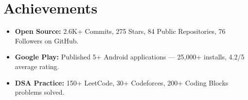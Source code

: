 \documentclass[letterpaper,11pt]{article}
\newcommand{\resumeItem}[1]{
  \item\small{#1 \vspace{-2pt}}
}
\newcommand{\resumeSubHeadingListStart}{\begin{itemize}[leftmargin=0.15in, label={}]}
\newcommand{\resumeSubHeadingListEnd}{\end{itemize}}
\begin{document}
\section{Achievements}
\resumeSubHeadingListStart
  \resumeItem{\textbf{Open Source:} 2.6K+ Commits, 275 Stars, 84 Public Repositories, 76 Followers on GitHub.}
  \resumeItem{\textbf{Google Play:} Published 5+ Android applications — 25,000+ installs, 4.2/5 average rating.}
  \resumeItem{\textbf{DSA Practice:} 150+ LeetCode, 30+ Codeforces, 200+ Coding Blocks problems solved.}
\resumeSubHeadingListEnd

\end{document}
